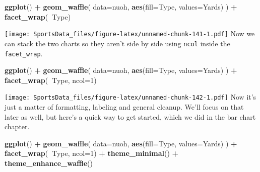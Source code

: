 \documentclass[
]{book}
\newenvironment{Shaded}{\begin{snugshade}}{\end{snugshade}}
\newcommand{\DataTypeTok}[1]{\textcolor[rgb]{0.13,0.29,0.53}{#1}}
\newcommand{\DecValTok}[1]{\textcolor[rgb]{0.00,0.00,0.81}{#1}}
\newcommand{\KeywordTok}[1]{\textcolor[rgb]{0.13,0.29,0.53}{\textbf{#1}}}
\newcommand{\NormalTok}[1]{#1}
\newcommand{\OperatorTok}[1]{\textcolor[rgb]{0.81,0.36,0.00}{\textbf{#1}}}
\newcommand{\StringTok}[1]{\textcolor[rgb]{0.31,0.60,0.02}{#1}}
\begin{document}
\begin{Shaded}
\begin{Highlighting}[]
\KeywordTok{ggplot}\NormalTok{() }\OperatorTok{+}\StringTok{ }\KeywordTok{geom_waffle}\NormalTok{(}
  \DataTypeTok{data=}\NormalTok{nuoh,}
  \KeywordTok{aes}\NormalTok{(}\DataTypeTok{fill=}\NormalTok{Type, }\DataTypeTok{values=}\NormalTok{Yards)}
\NormalTok{) }\OperatorTok{+}\StringTok{ }\KeywordTok{facet_wrap}\NormalTok{(}\OperatorTok{~}\NormalTok{Type)}
\end{Highlighting}
\end{Shaded}

\texttt{[image: SportsData\_files/figure-latex/unnamed-chunk-141-1.pdf]}
Now we can stack the two charts so they aren't side by side using \texttt{ncol} inside the \texttt{facet\_wrap}.

\begin{Shaded}
\begin{Highlighting}[]
\KeywordTok{ggplot}\NormalTok{() }\OperatorTok{+}\StringTok{ }\KeywordTok{geom_waffle}\NormalTok{(}
  \DataTypeTok{data=}\NormalTok{nuoh,}
  \KeywordTok{aes}\NormalTok{(}\DataTypeTok{fill=}\NormalTok{Type, }\DataTypeTok{values=}\NormalTok{Yards)}
\NormalTok{) }\OperatorTok{+}\StringTok{ }\KeywordTok{facet_wrap}\NormalTok{(}\OperatorTok{~}\NormalTok{Type, }\DataTypeTok{ncol=}\DecValTok{1}\NormalTok{)}
\end{Highlighting}
\end{Shaded}

\texttt{[image: SportsData\_files/figure-latex/unnamed-chunk-142-1.pdf]}
Now it's just a matter of formatting, labeling and general cleanup. We'll focus on that later as well, but here's a quick way to get started, which we did in the bar chart chapter.

\begin{Shaded}
\begin{Highlighting}[]
\KeywordTok{ggplot}\NormalTok{() }\OperatorTok{+}\StringTok{ }\KeywordTok{geom_waffle}\NormalTok{(}
  \DataTypeTok{data=}\NormalTok{nuoh,}
  \KeywordTok{aes}\NormalTok{(}\DataTypeTok{fill=}\NormalTok{Type, }\DataTypeTok{values=}\NormalTok{Yards)}
\NormalTok{) }\OperatorTok{+}\StringTok{  }
\StringTok{    }\KeywordTok{facet_wrap}\NormalTok{(}\OperatorTok{~}\NormalTok{Type, }\DataTypeTok{ncol=}\DecValTok{1}\NormalTok{) }\OperatorTok{+}\StringTok{ }
\StringTok{    }\KeywordTok{theme_minimal}\NormalTok{() }\OperatorTok{+}\StringTok{ }
\StringTok{    }\KeywordTok{theme_enhance_waffle}\NormalTok{()}
\end{Highlighting}
\end{Shaded}
\end{document}
